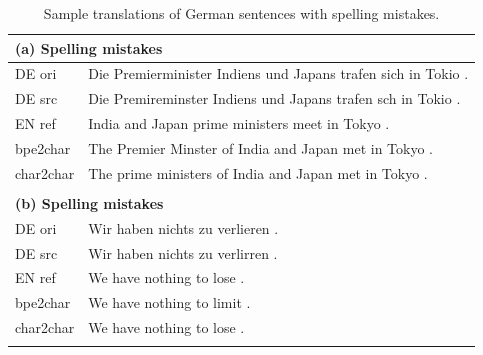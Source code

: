 \documentclass[11pt,letterpaper]{article}
\newcommand{\tb}{\textbf}
\newcommand{\clr}{\color{Red}}
\begin{document}
\begin{table}[t]
\footnotesize
\centering

\begin{tabular}{p{1.4cm}|p{14.6cm}}

\multicolumn{2}{l}{\tb{(a) Spelling mistakes}} \\ \hline \hline
DE ori  & Die Premi{\clr er}min{\clr i}ster Indiens und Japans trafen s{\clr i}ch in Tokio . \\ \hline
DE src  & Die Premi{\clr re}minster Indiens und Japans trafen sch in Tokio . \\ \hline
EN ref  & India and Japan {\clr prime ministers} meet in Tokyo . \\ \hline
bpe2char &  The {\clr Premier Minster} of India and Japan met in Tokyo . \\ \hline
char2char & The {\clr prime ministers} of India and Japan met in Tokyo . \\ \hline
\multicolumn{2}{l}{}       \\

\multicolumn{2}{l}{\tb{(b) Spelling mistakes}} \\ \hline \hline
DE ori  & Wir haben nichts zu verli{\clr er}en . \\ \hline
DE src  & Wir haben nichts zu verli{\clr rr}en . \\ \hline
EN ref  & We have nothing to {\clr lose} . \\ \hline
bpe2char & We have nothing to {\clr limit} . \\ \hline
char2char & We have nothing to {\clr lose} . \\ \hline
\multicolumn{2}{l}{}       \\

\end{tabular}
\vspace{-8mm}
\caption{Sample translations of German sentences with spelling mistakes.}
\label{table:typo}
\normalsize
\end{table}
\end{document}
